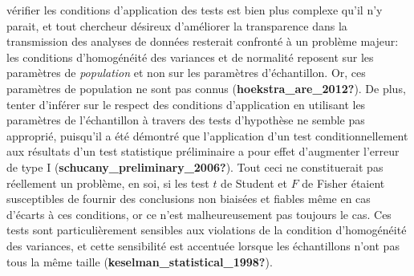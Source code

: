 \documentclass[
  english,
  man]{apa6}
\begin{document}
vérifier les conditions d'application des tests est bien plus complexe qu'il n'y parait, et tout chercheur désireux d'améliorer la transparence dans la transmission des analyses de données resterait confronté à un problème majeur: les conditions d'homogénéité des variances et de normalité reposent sur les paramètres de \emph{population} et non sur les paramètres d'échantillon. Or, ces paramètres de population ne sont pas connus (\textbf{hoekstra\_are\_2012?}). De plus, tenter d'inférer sur le respect des conditions d'application en utilisant les paramètres de l'échantillon à travers des tests d'hypothèse ne semble pas approprié, puisqu'il a été démontré que l'application d'un test conditionnellement aux résultats d'un test statistique préliminaire a pour effet d'augmenter l'erreur de type I (\textbf{schucany\_preliminary\_2006?}). Tout ceci ne constituerait pas réellement un problème, en soi, si les test \(t\) de Student et \(F\) de Fisher étaient susceptibles de fournir des conclusions non biaisées et fiables même en cas d'écarts à ces conditions, or ce n'est malheureusement pas toujours le cas. Ces tests sont particulièrement sensibles aux violations de la condition d'homogénéité des variances, et cette sensibilité est accentuée lorsque les échantillons n'ont pas tous la même taille (\textbf{keselman\_statistical\_1998?}).
\end{document}
